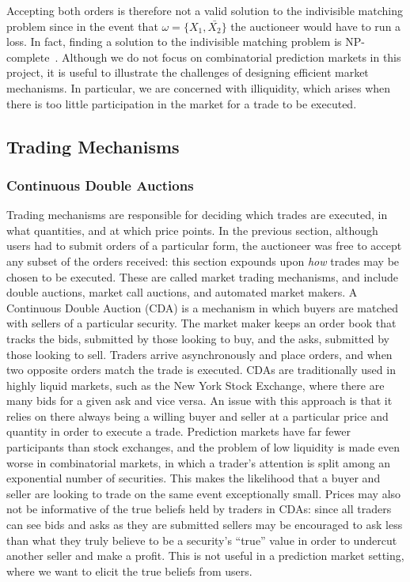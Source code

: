 Accepting both orders is therefore not a valid solution to the indivisible
matching problem since in the event that $\omega = \{X_1,\bar{X_2}\}$ the
auctioneer would have to run a loss. In fact, finding a solution to the
indivisible matching problem is NP-complete~\cite[Ch.~26]{AGTBook}. Although we
do not focus on combinatorial prediction markets in this project, it is useful
to illustrate the challenges of designing efficient market mechanisms. In
particular, we are concerned with illiquidity, which arises when there is too
little participation in the market for a trade to be executed.

\subsection{Trading Mechanisms}

\label{sec:tradingMechanisms}

\subsubsection{Continuous Double Auctions}

Trading mechanisms are responsible for deciding which trades are executed, in
what quantities, and at which price points. In the previous section, although
users had to submit orders of a particular form, the auctioneer was free to
accept any subset of the orders received: this section expounds upon \emph{how}
trades may be chosen to be executed. These are called market trading
mechanisms, and include double auctions, market call auctions, and automated
market makers. A Continuous Double Auction (CDA) is a mechanism in which buyers
are matched with sellers of a particular security. The market maker keeps an
order book that tracks the bids, submitted by those looking to buy, and the
asks, submitted by those looking to sell. Traders arrive asynchronously and
place orders, and when two opposite orders match the trade is executed. CDAs
are traditionally used in highly liquid markets, such as the New York Stock
Exchange, where there are many bids for a given ask and vice versa. An issue
with this approach is that it relies on there always being a willing buyer and
seller at a particular price and quantity in order to execute a trade.
Prediction markets have far fewer participants than stock exchanges, and the
problem of low liquidity is made even worse in combinatorial markets, in which
a trader's attention is split among an exponential number of securities. This
makes the likelihood that a buyer and seller are looking to trade on the same
event exceptionally small. Prices may also not be informative of the true
beliefs held by traders in CDAs: since all traders can see bids and asks as
they are submitted sellers may be encouraged to ask less than what they truly
believe to be a security's ``true'' value in order to undercut another seller
and make a profit. This is not useful in a prediction market setting, where we
want to elicit the true beliefs from users.


